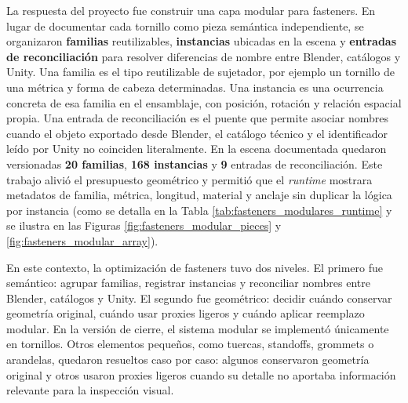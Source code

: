 La respuesta del proyecto fue construir una capa modular para fasteners. En lugar de documentar cada tornillo como pieza semántica independiente, se organizaron \textbf{familias} reutilizables, \textbf{instancias} ubicadas en la escena y \textbf{entradas de reconciliación} para resolver diferencias de nombre entre Blender, catálogos y Unity. Una familia es el tipo reutilizable de sujetador, por ejemplo un tornillo de una métrica y forma de cabeza determinadas. Una instancia es una ocurrencia concreta de esa familia en el ensamblaje, con posición, rotación y relación espacial propia. Una entrada de reconciliación es el puente que permite asociar nombres cuando el objeto exportado desde Blender, el catálogo técnico y el identificador leído por Unity no coinciden literalmente. En la escena documentada quedaron versionadas \textbf{20 familias}, \textbf{168 instancias} y \textbf{9} entradas de reconciliación. Este trabajo alivió el presupuesto geométrico y permitió que el \textit{runtime} mostrara metadatos de familia, métrica, longitud, material y anclaje sin duplicar la lógica por instancia (como se detalla en la Tabla \ref{tab:fasteners_modulares_runtime} y se ilustra en las Figuras \ref{fig:fasteners_modular_pieces} y \ref{fig:fasteners_modular_array}).

En este contexto, la optimización de fasteners tuvo dos niveles. El primero fue semántico: agrupar familias, registrar instancias y reconciliar nombres entre Blender, catálogos y Unity. El segundo fue geométrico: decidir cuándo conservar geometría original, cuándo usar proxies ligeros y cuándo aplicar reemplazo modular. En la versión de cierre, el sistema modular se implementó únicamente en tornillos. Otros elementos pequeños, como tuercas, standoffs, grommets o arandelas, quedaron resueltos caso por caso: algunos conservaron geometría original y otros usaron proxies ligeros cuando su detalle no aportaba información relevante para la inspección visual.

